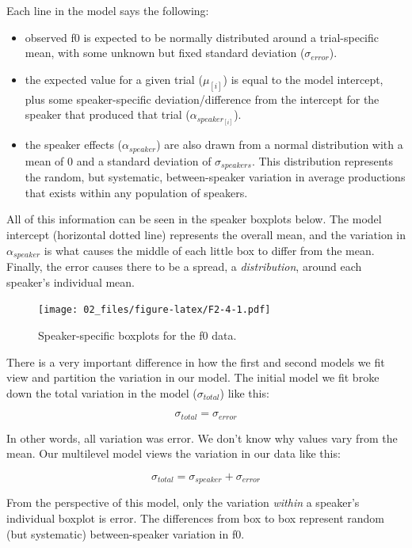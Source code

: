 \documentclass[
]{book}
\begin{document}
Each line in the model says the following:

\begin{itemize}
\item
  observed f0 is expected to be normally distributed around a trial-specific mean, with some unknown but fixed standard deviation (\(\sigma_{error}\)).
\item
  the expected value for a given trial (\(\mu_{[i]}\)) is equal to the model intercept, plus some speaker-specific deviation/difference from the intercept for the speaker that produced that trial (\(\alpha_{speaker_{[i]}}\)).
\item
  the speaker effects (\(\alpha_{speaker}\)) are also drawn from a normal distribution with a mean of 0 and a standard deviation of \(\sigma_{speakers}\). This distribution represents the random, but systematic, between-speaker variation in average productions that exists within any population of speakers.
\end{itemize}

All of this information can be seen in the speaker boxplots below. The model intercept (horizontal dotted line) represents the overall mean, and the variation in \(\alpha_{speaker}\) is what causes the middle of each little box to differ from the mean. Finally, the error causes there to be a spread, a \emph{distribution}, around each speaker's individual mean.

\begin{figure}
\centering
\texttt{[image: 02\_files/figure-latex/F2-4-1.pdf]}
\caption{\label{fig:F2-4}Speaker-specific boxplots for the f0 data.}
\end{figure}

There is a very important difference in how the first and second models we fit view and partition the variation in our model. The initial model we fit broke down the total variation in the model (\(\sigma_{total}\)) like this:

\[
\sigma_{total} = \sigma_{error}
\label{eq:29}
\]

In other words, all variation was error. We don't know why values vary from the mean. Our multilevel model views the variation in our data like this:

\[
\sigma_{total} = \sigma_{speaker} + \sigma_{error}
\label{eq:210}
\]

From the perspective of this model, only the variation \emph{within} a speaker's individual boxplot is error. The differences from box to box represent random (but systematic) between-speaker variation in f0.
\end{document}
